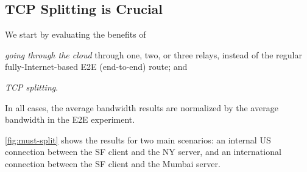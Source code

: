\documentclass[10pt,sigconf]{acmart}
\newcommand{\mycomm}[3]{{\color{#2} \textbf{[#1: #3]}}}
\newcommand{\mycomm}[3]{}
\newcommand{\IK}[1]{\mycomm{IK}{blue}{#1}}
\newcommand{\AB}[1]{\mycomm{AB}{orange}{#1}}
\newcommand{\NR}[1]{\mycomm{NR}{violet}{#1}}
\begin{document}




\subsection{TCP Splitting is Crucial} 

We start by evaluating the benefits of 
\begin{inlinelist}
    \item \textit{going through the cloud} through one, two, or three relays,  instead of the regular fully-Internet-based E2E (end-to-end) route; and \item \textit{TCP splitting}.
\end{inlinelist} In all cases, the average bandwidth results are normalized by the average bandwidth in the E2E experiment.

\autoref{fig:must-split} shows the results for two main scenarios: an internal US connection between the SF client and the NY server, and an international connection between the SF client and the Mumbai server. %
\end{document}

